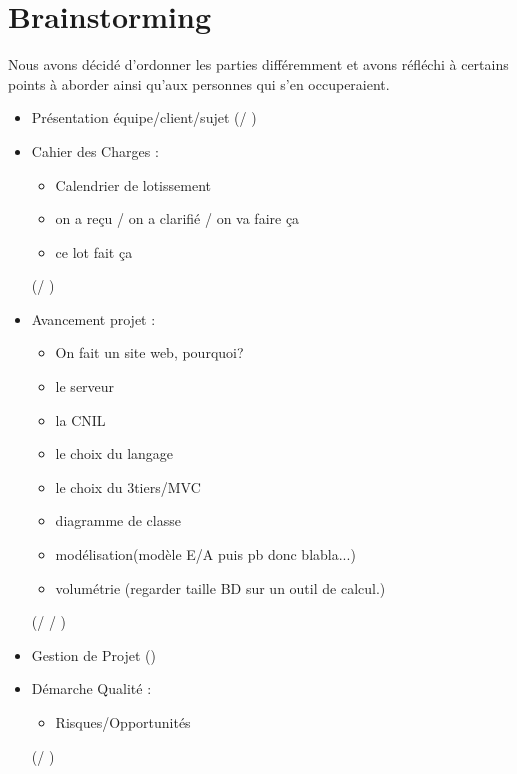 \documentclass [a4paper] {article}
\begin{document}
\section{Brainstorming}
Nous avons décidé d'ordonner les parties différemment et avons réfléchi à certains points à aborder ainsi qu'aux personnes qui s'en occuperaient.
\begin{itemize}
\item Présentation équipe/client/sujet (\Melissa / \Sergi)
\item Cahier des Charges : 
\begin{itemize} 
\item Calendrier de lotissement 
\item on a reçu / on a clarifié / on va faire ça 
\item ce lot fait ça 
\end{itemize} (\Mathieu / \Michel)
\item Avancement projet : 
\begin{itemize} 
\item On fait un site web, pourquoi? 
\item le serveur 
\item la CNIL 
\item le choix du langage 
\item le choix du 3tiers/MVC 
\item diagramme de classe 
\item modélisation(modèle E/A puis pb donc blabla...) 
\item volumétrie (regarder taille BD sur un outil de calcul.) 
\end{itemize} (\Florian / \Matthieu / \Julie)
\item Gestion de Projet (\Sergi)
\item Démarche Qualité : 
\begin{itemize} 
\item Risques/Opportunités 
\end{itemize} (\Pierre / \Kafui)


\end{itemize}


\end{document}
